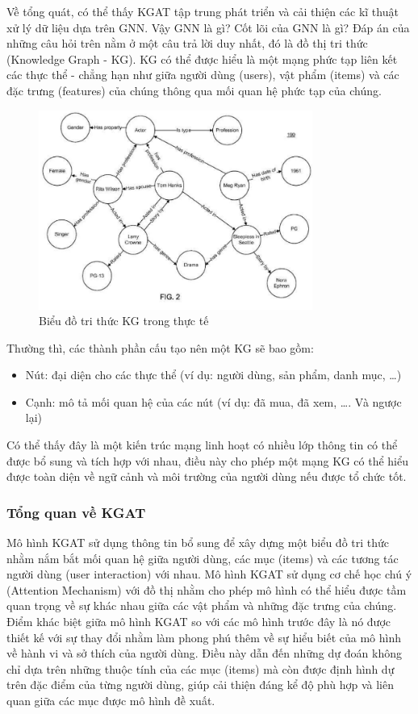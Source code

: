 Về tổng quát, có thể thấy KGAT tập trung phát triển và cải thiện các kĩ thuật xử lý dữ liệu dựa trên GNN. Vậy GNN là gì? Cốt lõi của GNN là gì? Đáp án của những câu hỏi trên nằm ở một câu trả lời duy nhất, đó là đồ thị tri thức (Knowledge Graph - KG). KG có thể được hiểu là một mạng phức tạp liên kết các thực thể - chẳng hạn như giữa người dùng (users), vật phẩm (items) và các đặc trưng (features) của chúng thông qua mối quan hệ phức tạp của chúng.

\begin{figure}[h]
    \centering
    \includegraphics[width=0.8\textwidth]{figures/64.png}
    \caption{Biểu đồ tri thức KG trong thực tế}
    \label{fig:kg_example}
\end{figure}

Thường thì, các thành phần cấu tạo nên một KG sẽ bao gồm:
\begin{itemize}
    \item Nút: đại diện cho các thực thể (ví dụ: người dùng, sản phẩm, danh mục, …)
    \item Cạnh: mô tả mối quan hệ của các nút (ví dụ: đã mua, đã xem, …. Và ngược lại)
\end{itemize}

Có thể thấy đây là một kiến trúc mạng linh hoạt có nhiều lớp thông tin có thể được bổ sung và tích hợp với nhau, điều này cho phép một mạng KG có thể hiểu được toàn diện về ngữ cảnh và môi trường của người dùng nếu được tổ chức tốt.

\subsubsection{Tổng quan về KGAT}
Mô hình KGAT sử dụng thông tin bổ sung để xây dựng một biểu đồ tri thức nhằm nắm bắt mối quan hệ giữa người dùng, các mục (items) và các tương tác người dùng (user interaction) với nhau. Mô hình KGAT sử dụng cơ chế học chú ý (Attention Mechanism) với đồ thị nhằm cho phép mô hình có thể hiểu được tầm quan trọng về sự khác nhau giữa các vật phẩm và những đặc trưng của chúng. Điểm khác biệt giữa mô hình KGAT so với các mô hình trước đây là nó được thiết kế với sự thay đổi nhằm làm phong phú thêm về sự hiểu biết của mô hình về hành vi và sở thích của người dùng. Điều này dẫn đến những dự đoán không chỉ dựa trên những thuộc tính của các mục (items) mà còn được định hình dự trên đặc điểm của từng người dùng, giúp cải thiện đáng kể độ phù hợp và liên quan giữa các mục được mô hình đề xuất.

